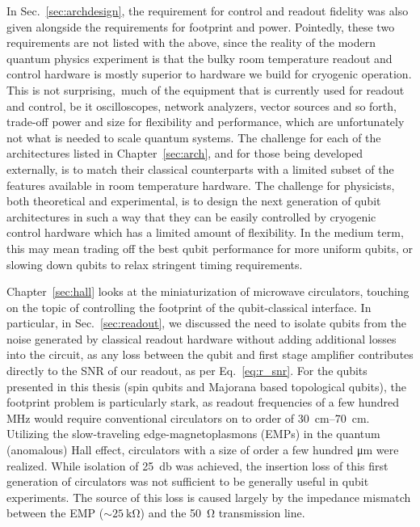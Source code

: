 In Sec.~\ref{sec:archdesign}, the requirement for control and readout fidelity was also given alongside the requirements for footprint and power. Pointedly,
these two requirements are not listed with the above, since the reality of the modern quantum physics experiment is that the bulky room temperature readout
and control hardware is mostly superior to hardware we build for cryogenic operation. This is not surprising, much of the equipment that is currently used
for readout and control, be it oscilloscopes, network analyzers, vector sources and so forth, trade-off power and size for flexibility and performance, which
are unfortunately not what is needed to scale quantum systems. The challenge for each of the architectures listed in Chapter~\ref{sec:arch}, and for those
being developed externally, is to match their classical counterparts with a limited subset of the features available in room temperature hardware.
The challenge for physicists, both theoretical and experimental, is to design the next generation of qubit architectures in such a way that they can be easily
controlled by cryogenic control hardware which has a limited amount of flexibility. In the medium term, this may mean trading off the best qubit performance
for more uniform qubits, or slowing down qubits to relax stringent timing requirements.

Chapter~\ref{sec:hall} looks at the miniaturization of microwave circulators, touching on the topic of controlling the footprint of the qubit-classical
interface. In particular, in Sec.~\ref{sec:readout}, we discussed the need to isolate qubits from the noise generated by classical readout hardware without
adding additional losses into the circuit, as any loss between the qubit and first stage amplifier contributes directly to the SNR of our readout, as per
Eq.~\ref{eq:r_snr}. For the qubits presented in this thesis (spin qubits and Majorana based topological qubits), the footprint problem is particularly
stark, as readout frequencies of a few hundred \si{\mega\hertz} would require conventional circulators on to order of \SIrange{30}{70}{\centi\meter}.
Utilizing the slow-traveling edge-magnetoplasmons (EMPs) in the quantum (anomalous) Hall effect, circulators with a size of order a few hundred
\si{\micro\meter} were realized. While isolation of \SI{25}{\decibel} was achieved, the insertion loss of this first generation of circulators was not sufficient to
be generally useful in qubit experiments. The source of this loss is caused largely by the impedance mismatch between the EMP ($\sim \SI{25}{\kilo\ohm}$) and the
\SI{50}{\ohm} transmission line.

